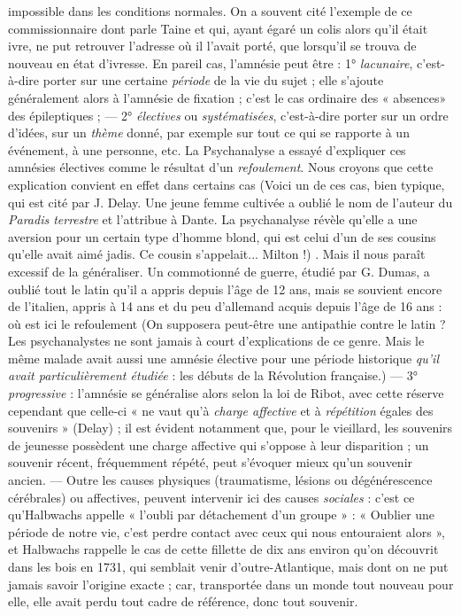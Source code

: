{{%
impossible dans les conditions normales. On a souvent cité l'exemple de
ce commissionnaire dont parle Taine et qui, ayant égaré un colis alors qu'il
était ivre, ne put retrouver l'adresse où il l’avait porté, que lorsqu'il se
trouva de nouveau en état d'ivresse. En pareil cas, l’amnésie peut être :
1° {\it lacunaire}, c’est-à-dire porter sur une certaine {\it période} de la vie du sujet ;
elle s'ajoute généralement alors à l’amnésie de fixation ; c’est le cas ordinaire
des « absences» des épileptiques ; — 2° {\it électives} ou {\it systématisées},
c’est-à-dire porter sur un ordre d'idées, sur un {\it thème} donné, par exemple
sur tout ce qui se rapporte à un événement, à une personne, etc. La Psychanalyse
a essayé d’expliquer ces amnésies électives comme le résultat d’un
\textsf{\textit {refoulement}}. Nous croyons que cette explication convient en effet dans certains
cas
{\scriptsize (Voici un de ces cas, bien typique, qui est cité par J. Delay. Une jeune femme cultivée
a oublié le nom de l’auteur du {\it Paradis terrestre} et l’attribue à Dante. La psychanalyse
révèle qu’elle a une aversion pour un certain type d'homme blond, qui est celui
d’un de ses cousins qu’elle avait aimé jadis. Ce cousin s'appelait... Milton !)}
. Mais il nous paraît excessif de la généraliser. Un commotionné
de guerre, étudié par G. Dumas, a oublié tout le latin qu'il a appris depuis
l’âge de 12 ans, mais se souvient encore de l'italien, appris à 14 ans et du
peu d’allemand acquis depuis l’âge de 16 ans : où est ici le refoulement
{\scriptsize (On supposera peut-être une antipathie contre le latin ? Les psychanalystes ne
sont jamais à court d'explications de ce genre. Mais le même malade avait aussi une
amnésie élective pour une période historique {\it qu’il avait particulièrement étudiée} : les
débuts de la Révolution française.)}
— 3° {\it progressive} : l’amnésie se généralise alors selon la loi de Ribot, avec
cette réserve cependant que celle-ci « ne vaut qu’à {\it charge affective} et à
{\it répétition} égales des souvenirs » (Delay) ; il est évident notamment que,
pour le vieillard, les souvenirs de jeunesse possèdent une charge affective
qui s'oppose à leur disparition ; un souvenir récent, fréquemment répété,
peut s'évoquer mieux qu’un souvenir ancien. — Outre les causes physiques
(traumatisme, lésions ou dégénérescence cérébrales) ou affectives,
peuvent intervenir ici des causes \textsf{\textit {sociales}} : c’est ce qu'Halbwachs appelle
« l'oubli par détachement d’un groupe » : « Oublier une période de notre vie,
c’est perdre contact avec ceux qui nous entouraient alors », et Halbwachs
rappelle le cas de cette fillette de dix ans environ qu’on découvrit dans les
bois en 1731, qui semblait venir d’outre-Atlantique, mais dont on ne put
jamais savoir l’origine exacte ; car, transportée dans un monde tout nouveau
pour elle, elle avait perdu tout cadre de référence, donc tout souvenir.

}}

